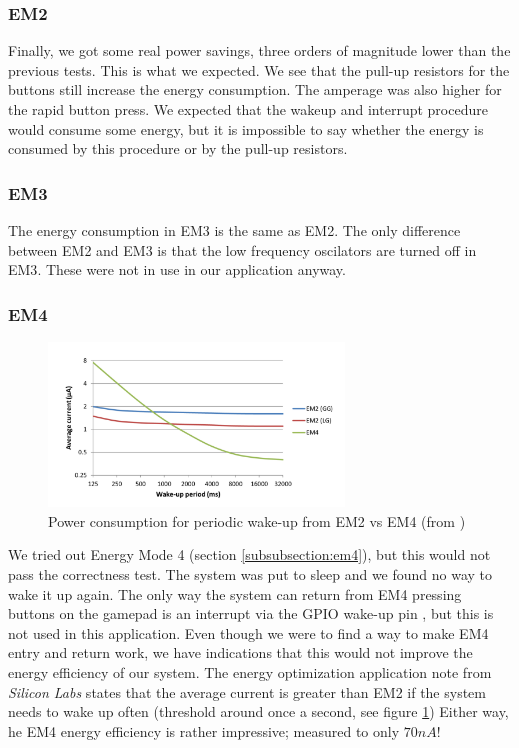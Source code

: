 		\subsubsection{EM2}
		Finally, we got some real power savings, three orders of magnitude lower than the previous tests. This is what we expected. We see that the pull-up resistors for the buttons still increase the energy consumption. The amperage was also higher for the rapid button press. We expected that the wakeup and interrupt procedure would consume some energy, but it is impossible to say whether the energy is consumed by this procedure or by the pull-up resistors.

		\subsubsection{EM3}
		The energy consumption in EM3 is the same as EM2. The only difference between EM2 and EM3 is that the low frequency oscilators are turned off in EM3\cite[p. 2]{enegy_optimization_application_note}. These were not in use in our application anyway.

		\subsubsection{EM4}
		\begin{figure}[t]
			\centerline{
				\includegraphics[width=0.7\textwidth]{img/em2vsem4.png}
			}
			\caption{Power consumption for periodic wake-up from EM2 vs EM4 (from \cite[p. 9]{energy_optimization_application_note})}
			\label{fig:em2vsem4}
			
		\end{figure}
		We tried out Energy Mode 4 (section \ref{subsubsection:em4}), but this would not pass the correctness test. The system was put to sleep and we found no way to wake it up again. The only way the system can return from EM4 pressing buttons on the gamepad is an interrupt via the GPIO wake-up pin \cite[p. 8]{reference_manual}, but this is not used in this application. Even though we were to find a way to make EM4 entry and return work, we have indications that this would not improve the energy efficiency of our system. The energy optimization application note from \emph{Silicon Labs} states that the average current is greater than EM2 if the system needs to wake up often (threshold around once a second, see figure \ref{fig:em2vsem4})  Either way, he EM4 energy efficiency is rather impressive; measured to only $70nA$!

